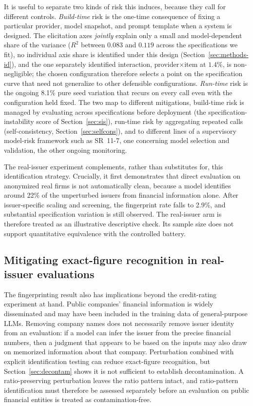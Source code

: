 \documentclass[a4paper,fleqn]{cas-sc}
\begin{document}
It is useful to separate two kinds of risk this induces, because they call for different controls.
\emph{Build-time} risk is the one-time consequence of fixing a particular provider, model snapshot, and
prompt template when a system is designed. The elicitation axes \emph{jointly} explain only a small and
model-dependent share of the variance ($R^2$ between $0.083$ and $0.119$ across the specifications
we fit), no individual axis share is identified under this design
(Section~\ref{sec:methods-id}), and the one separately identified interaction,
provider$\times$item at $1.4\%$, is non-negligible; the chosen configuration therefore selects a
point on the specification curve that need not generalize to other defensible configurations. \emph{Run-time} risk is
the ongoing 8.1\% pure seed variation that recurs on every call even with the configuration held fixed.
The two map to different mitigations, build-time risk is managed by evaluating across specifications
before deployment (the specification-instability score of Section~\ref{sec:sis}), run-time risk by
aggregating repeated calls (self-consistency, Section~\ref{sec:selfcons}), and to different lines of a
supervisory model-risk framework such as SR~11-7, one concerning model selection and validation, the
other ongoing monitoring.

The real-issuer experiment complements, rather than substitutes for, this identification strategy.
Crucially, it first demonstrates that direct evaluation on anonymized real firms is not automatically clean, because a model identifies around 22\% of the unperturbed issuers from financial information alone. After
issuer-specific scaling and screening, the fingerprint rate falls to 2.9\%, and substantial
specification variation is still observed. The real-issuer arm is therefore treated as an illustrative
descriptive check. Its sample size does not support quantitative equivalence with the controlled battery.

\subsection{Mitigating exact-figure recognition in real-issuer evaluations}
The fingerprinting result also has implications beyond the credit-rating experiment at hand. Public
companies' financial information is widely disseminated and may have been included in the training data
of general-purpose LLMs. Removing company names does not necessarily remove issuer identity from an
evaluation: if a model can infer the issuer from the precise financial numbers, then a judgment that
appears to be based on the inputs may also draw on memorized information about that company. Perturbation combined with explicit identification testing can reduce exact-figure recognition,
but Section~\ref{sec:decontam} shows it is not sufficient to establish decontamination. A
ratio-preserving perturbation leaves the ratio pattern intact, and ratio-pattern identification must
therefore be assessed separately before an evaluation on public financial entities is treated as
contamination-free.
\end{document}
